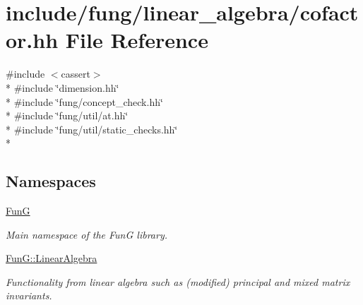 \hypertarget{cofactor_8hh}{\section{include/fung/linear\-\_\-algebra/cofactor.hh File Reference}
\label{cofactor_8hh}
}
{\ttfamily \#include $<$cassert$>$}\\*
{\ttfamily \#include \char`\"{}dimension.\-hh\char`\"{}}\\*
{\ttfamily \#include \char`\"{}fung/concept\-\_\-check.\-hh\char`\"{}}\\*
{\ttfamily \#include \char`\"{}fung/util/at.\-hh\char`\"{}}\\*
{\ttfamily \#include \char`\"{}fung/util/static\-\_\-checks.\-hh\char`\"{}}\\*
\subsection*{Namespaces}
\begin{DoxyCompactItemize}
\item 
\hyperlink{namespaceFunG}{Fun\-G}
\begin{DoxyCompactList}\small\item\em Main namespace of the Fun\-G library. \end{DoxyCompactList}\item 
\hyperlink{namespaceFunG_1_1LinearAlgebra}{Fun\-G\-::\-Linear\-Algebra}
\begin{DoxyCompactList}\small\item\em Functionality from linear algebra such as (modified) principal and mixed matrix invariants. \end{DoxyCompactList}\end{DoxyCompactItemize}
